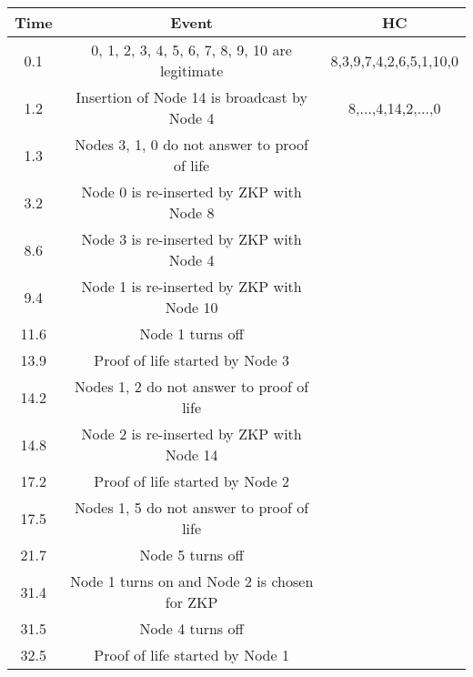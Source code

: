 \documentclass{article}
\begin{document}
\begin{table}\begin{center}
\begin{tabular}{|c|c|c|} \hline
Time& Event  & HC  \\ \hline

0.1 & \scriptsize{0, 1, 2, 3, 4, 5, 6, 7, 8, 9, 10 are legitimate}
& \scriptsize{8,3,9,7,4,2,6,5,1,10,0}\\

1.2 & \scriptsize{Insertion of Node 14 is broadcast by Node 4}  &
\scriptsize{8,...,4,14,2,...,0} \\

1.3 &\scriptsize{ Nodes 3, 1, 0 do not answer to proof of life} &
\\

3.2 & \scriptsize{Node 0 is re-inserted by ZKP with Node 8} &
\\

8.6 & \scriptsize{Node 3 is re-inserted by ZKP with Node 4} &
\\

9.4 &\scriptsize{ Node 1 is re-inserted by ZKP with Node 10} &
\\

11.6 &\scriptsize{ Node 1 turns off }& \\

13.9 & \scriptsize{Proof of life started by Node 3} & \\

14.2 & \scriptsize{Nodes 1, 2 do not answer to proof of life} &
\\

14.8 &\scriptsize{ Node 2 is re-inserted by ZKP with Node 14} &
\\

17.2 &\scriptsize{ Proof of life started by Node 2} & \\

17.5 & \scriptsize{Nodes 1, 5 do not answer to proof of life } &
\\

21.7 & \scriptsize{Node 5 turns off }& \\

31.4 & \scriptsize{Node 1  turns on and Node 2 is chosen for ZKP
}& \\

31.5 &\scriptsize{ Node 4 turns off }& \\

32.5 & \scriptsize{Proof of life started by Node 1} & \\


\end{tabular}
\end{center}
\end{table}
\end{document}
